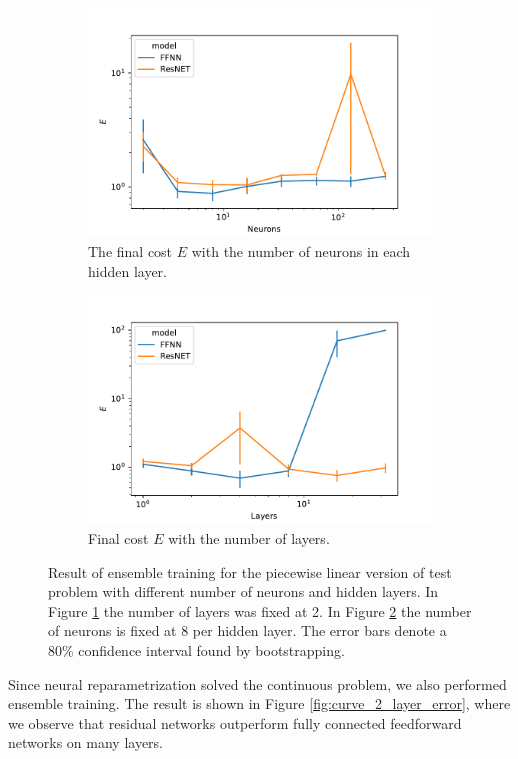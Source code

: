 \begin{figure}[t]
    \begin{subfigure}[t]{0.5\textwidth}
        \centering
        \includegraphics[width=\linewidth]{figures/curve_1_pl/exp_2/neurons_error.pdf}
        \caption{The final cost \(E\) with the number of neurons in each hidden layer.}\label{fig:curve_1_pl_neuron_error}
    \end{subfigure}
    \begin{subfigure}[t]{0.5\textwidth}
        \centering
        \includegraphics[width=\linewidth]{figures/curve_1_pl/exp_2/layer_error.pdf}
        \caption{Final cost \(E\) with the number of layers.}\label{fig:curve_1_pl_layer_error}
    \end{subfigure}
    \caption{Result of ensemble training for the piecewise linear version of test problem with different number of neurons and hidden layers. In Figure \ref{fig:curve_1_pl_neuron_error} the number of layers was fixed at 2. In Figure \ref{fig:curve_1_pl_layer_error} the number of neurons is fixed at 8 per hidden layer. The error bars denote a 80\% confidence interval found by bootstrapping.}\label{fig:curve_1_pl_eks}
\end{figure}

Since neural reparametrization solved the continuous problem, we also performed ensemble training. The result is shown in Figure \ref{fig:curve_2_layer_error}, where we observe that residual networks outperform fully connected feedforward networks on many layers. 